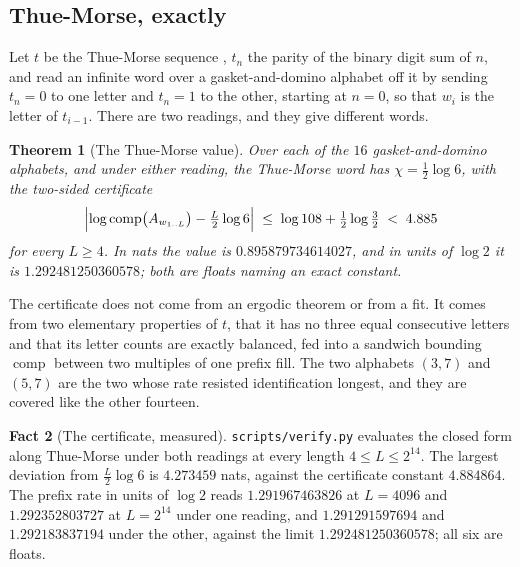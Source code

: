 \documentclass[11pt]{amsart}
\newtheorem{theorem}{Theorem}[section]
\theoremstyle{definition}
\newtheorem{fact}[theorem]{Fact}
\theoremstyle{remark}
\newcommand{\vpy}{\texttt{scripts/\allowbreak verify.py}}
\DeclareMathOperator{\comp}{comp}
\begin{document}
\subsection{Thue-Morse, exactly}

Let $t$ be the Thue-Morse sequence \cite{oeisA010060}, $t_n$ the parity of the binary digit sum of $n$, and read an infinite word over a gasket-and-domino alphabet off it by sending $t_n = 0$ to one letter and $t_n = 1$ to the other, starting at $n = 0$, so that $w_i$ is the letter of $t_{i-1}$. There are two readings, and they give different words.

\begin{theorem}[The Thue-Morse value]
\label{thm:morse}
Over each of the $16$ gasket-and-domino alphabets, and under either reading, the Thue-Morse word has $\chi = \tfrac12 \log 6$, with the two-sided certificate
\[
\Bigl| \log\comp\bigl(A_{w_{1..L}}\bigr) - \tfrac{L}{2}\log 6 \Bigr| \;\le\; \log 108 + \tfrac12 \log\tfrac32 \;<\; 4.885
\]
for every $L \ge 4$.
In nats the value is $0.895879734614027$, and in units of $\log 2$ it is $1.292481250360578$; both are floats naming an exact constant.
\end{theorem}

The certificate does not come from an ergodic theorem or from a fit. It comes from two elementary properties of $t$, that it has no three equal consecutive letters and that its letter counts are exactly balanced, fed into a sandwich bounding $\comp$ between two multiples of one prefix fill. The two alphabets $(3,7)$ and $(5,7)$ are the two whose rate resisted identification longest, and they are covered like the other fourteen.

\begin{fact}[The certificate, measured]
\label{fact:morse}
\vpy{} evaluates the closed form along Thue-Morse under both readings at every length $4 \le L \le 2^{14}$. The largest deviation from $\tfrac{L}{2}\log 6$ is $4.273459$ nats, against the certificate constant $4.884864$. The prefix rate in units of $\log 2$ reads $1.291967463826$ at $L = 4096$ and $1.292352803727$ at $L = 2^{14}$ under one reading, and $1.291291597694$ and $1.292183837194$ under the other, against the limit $1.292481250360578$; all six are floats.
\end{fact}
\end{document}
